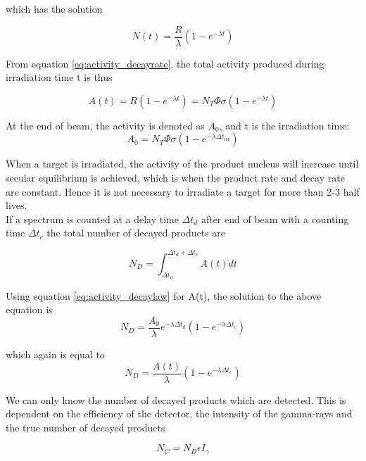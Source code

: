 \documentclass[a4paper,11pt,twoside]{book}
\begin{document}
which has the solution

\begin{equation}
    N(t) = \frac{R}{\lambda}(1-e^{-\lambda t})
\end{equation}

From equation \ref{eq:activity_decayrate}, the total activity produced during irradiation time t is thus 

\begin{equation} 
    A(t) = R(1-e^{-\lambda t}) = N_T \Phi \sigma (1-e^{-\lambda t})
\end{equation}

At the end of beam, the activity is denoted as $A_0$, and t is the irradiation time:
\begin{equation} \label{eq:activity_eob}
    A_0 = N_T \Phi \sigma (1-e^{-\lambda \Delta t_\text{irr}})
\end{equation}

\noindent 
When a target is irradiated, the activity of the product nucleus will increase until secular equilibrium is achieved, which is when the product rate and decay rate are constant. Hence it is not necessary to irradiate a target for more than 2-3 half lives.\\

\noindent 
If a spectrum is counted at a delay time $\Delta t_d$ after end of beam with a counting time $\Delta t_c$  the total number of decayed products are 

\begin{equation}
    N_D = \int_{\Delta t_d}^{\Delta t_d + \Delta t_c} A(t) dt
\end{equation}

Using equation \ref{eq:activity_decaylaw} for A(t), the solution to the above equation is 
\begin{equation} \label{eq:numb_of_decayed}
    N_D= \frac{A_0}{\lambda}e^{-\lambda \Delta t_d}(1-e^{-\lambda \Delta t_c})
\end{equation}

which again is equal to
\begin{equation}
    N_D = \frac{A(t)}{\lambda} (1-e^{-\lambda \Delta t_c})
\end{equation}

We can only know the number of decayed products which are detected. This is dependent on the efficiency of the detector, the intensity of the gamma-rays and the true number of decayed products

\begin{equation}\label{eq:Ngamma}
    N_C  = N_D \epsilon I_\gamma
\end{equation}
\end{document}
